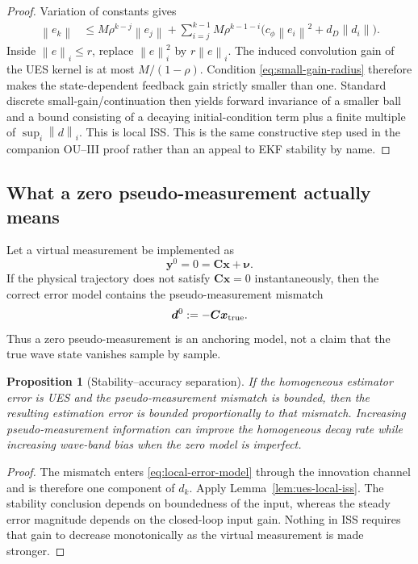 \documentclass[conference]{IEEEtran}
\DeclareRobustCommand{\vct}[1]{\bm{#1}}
\DeclareRobustCommand{\mat}[1]{\bm{#1}}
\newcommand{\norm}[1]{\left\lVert#1\right\rVert}
\newtheorem{proposition}{Proposition}
\theoremstyle{remark}
\begin{document}
\begin{proof}
Variation of constants gives
\begin{align}
 \norm{e_k}
 &\le M\rho^{k-j}\norm{e_j}
 +\sum_{i=j}^{k-1}M\rho^{k-1-i}
 \bigl(c_\phi\norm{e_i}^2+d_D\norm{d_i}\bigr).
 \label{eq:voc-bound}
\end{align}
Inside $\norm e_i\le r$, replace $\norm e_i^2$ by
$r\norm e_i$.  The induced convolution gain of the UES kernel is at most
$M/(1-\rho)$.  Condition \eqref{eq:small-gain-radius} therefore makes the
state-dependent feedback gain strictly smaller than one.  Standard discrete
small-gain/continuation then yields forward invariance of a smaller ball and a
bound consisting of a decaying initial-condition term plus a finite multiple of
$\sup_i\norm d_i$.  This is local ISS.  This is the same constructive step used
in the companion OU--III proof rather than an appeal to EKF stability by name.
\end{proof}

\subsection{What a zero pseudo-measurement actually means}
Let a virtual measurement be implemented as
\begin{equation}
  \vct y^{0}=0=\mat C\vct x+\vct\nu.
  \label{eq:pseudo-zero}
\end{equation}
If the physical trajectory does not satisfy $\mat C\vct x=0$ instantaneously,
then the correct error model contains the pseudo-measurement mismatch
\begin{equation}
  \vct d^{0}:=-\mat C\vct x_{\rm true}.
\end{equation}
Thus a zero pseudo-measurement is an anchoring model, not a claim that the true
wave state vanishes sample by sample.

\begin{proposition}[Stability--accuracy separation]
\label{prop:stability-accuracy}
If the homogeneous estimator error is UES and the pseudo-measurement mismatch is
bounded, then the resulting estimation error is bounded proportionally to that
mismatch.  Increasing pseudo-measurement information can improve the homogeneous
decay rate while increasing wave-band bias when the zero model is imperfect.
\end{proposition}

\begin{proof}
The mismatch enters \eqref{eq:local-error-model} through the innovation channel
and is therefore one component of $d_k$.  Apply Lemma~\ref{lem:ues-local-iss}.
The stability conclusion depends on boundedness of the input, whereas the
steady error magnitude depends on the closed-loop input gain.  Nothing in ISS
requires that gain to decrease monotonically as the virtual measurement is made
stronger.
\end{proof}
\end{document}
